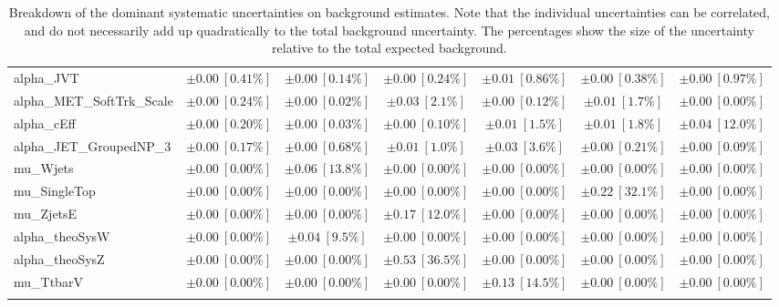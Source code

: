 \begin{sidewaystable}
\begin{center}
\begin{tabular*}{\textwidth}{@{\extracolsep{\fill}}lcccccc}
alpha\_JVT         & $\pm 0.00\ [0.41\%] $          & $\pm 0.00\ [0.14\%] $          & $\pm 0.00\ [0.24\%] $          & $\pm 0.01\ [0.86\%] $          & $\pm 0.00\ [0.38\%] $          & $\pm 0.00\ [0.97\%] $       \\
alpha\_MET\_SoftTrk\_Scale         & $\pm 0.00\ [0.24\%] $          & $\pm 0.00\ [0.02\%] $          & $\pm 0.03\ [2.1\%] $          & $\pm 0.00\ [0.12\%] $          & $\pm 0.01\ [1.7\%] $          & $\pm 0.00\ [0.00\%] $       \\
alpha\_cEff         & $\pm 0.00\ [0.20\%] $          & $\pm 0.00\ [0.03\%] $          & $\pm 0.00\ [0.10\%] $          & $\pm 0.01\ [1.5\%] $          & $\pm 0.01\ [1.8\%] $          & $\pm 0.04\ [12.0\%] $       \\
alpha\_JET\_GroupedNP\_3         & $\pm 0.00\ [0.17\%] $          & $\pm 0.00\ [0.68\%] $          & $\pm 0.01\ [1.0\%] $          & $\pm 0.03\ [3.6\%] $          & $\pm 0.00\ [0.21\%] $          & $\pm 0.00\ [0.09\%] $       \\
mu\_Wjets         & $\pm 0.00\ [0.00\%] $          & $\pm 0.06\ [13.8\%] $          & $\pm 0.00\ [0.00\%] $          & $\pm 0.00\ [0.00\%] $          & $\pm 0.00\ [0.00\%] $          & $\pm 0.00\ [0.00\%] $       \\
mu\_SingleTop         & $\pm 0.00\ [0.00\%] $          & $\pm 0.00\ [0.00\%] $          & $\pm 0.00\ [0.00\%] $          & $\pm 0.00\ [0.00\%] $          & $\pm 0.22\ [32.1\%] $          & $\pm 0.00\ [0.00\%] $       \\
mu\_ZjetsE         & $\pm 0.00\ [0.00\%] $          & $\pm 0.00\ [0.00\%] $          & $\pm 0.17\ [12.0\%] $          & $\pm 0.00\ [0.00\%] $          & $\pm 0.00\ [0.00\%] $          & $\pm 0.00\ [0.00\%] $       \\
alpha\_theoSysW         & $\pm 0.00\ [0.00\%] $          & $\pm 0.04\ [9.5\%] $          & $\pm 0.00\ [0.00\%] $          & $\pm 0.00\ [0.00\%] $          & $\pm 0.00\ [0.00\%] $          & $\pm 0.00\ [0.00\%] $       \\
alpha\_theoSysZ         & $\pm 0.00\ [0.00\%] $          & $\pm 0.00\ [0.00\%] $          & $\pm 0.53\ [36.5\%] $          & $\pm 0.00\ [0.00\%] $          & $\pm 0.00\ [0.00\%] $          & $\pm 0.00\ [0.00\%] $       \\
mu\_TtbarV         & $\pm 0.00\ [0.00\%] $          & $\pm 0.00\ [0.00\%] $          & $\pm 0.00\ [0.00\%] $          & $\pm 0.13\ [14.5\%] $          & $\pm 0.00\ [0.00\%] $          & $\pm 0.00\ [0.00\%] $       \\
\noalign{\smallskip}\hline\noalign{\smallskip}
\end{tabular*}
\end{center}
\caption[Breakdown of uncertainty on background estimates]{
Breakdown of the dominant systematic uncertainties on background estimates.
Note that the individual uncertainties can be correlated, and do not necessarily add up quadratically to 
the total background uncertainty. The percentages show the size of the uncertainty relative to the total expected background.
\label{table.results.bkgestimate.uncertainties.SRE_bybkg}}
\end{sidewaystable}
%
